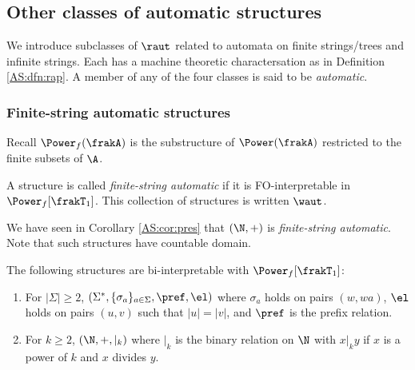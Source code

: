 
\subsection{Other classes of automatic structures}

We introduce subclasses of $\raut$ related to automata on finite strings/trees and infinite strings. 
Each has a machine theoretic charactersation as in Definition \ref{AS:dfn:rap}.
A member of any of the four classes is said to be {\em automatic}. %

\subsubsection*{Finite-string automatic structures}

Recall  $\Power_f(\frakA)$ is the substructure of $\Power(\frakA)$ restricted to the finite subsets of $\A$.

\begin{definition} 
A structure is called {\em finite-string automatic} if it is FO-interpretable in $\Power_f[\frakT_1]$. This collection of structures is written $\waut$.
\end{definition}

We have seen in Corollary \ref{AS:cor:pres} that $(\N,+)$ is {\em finite-string automatic}. 
Note that such structures have countable domain. 

\begin{example}
The following structures are bi-interpretable with $\Power_f[\frakT_1]$:
\begin{enumerate} 
\item For $|\Sigma| \geq 2$, $(\Sigma^\ast,\{\sigma_a\}_{a \in \Sigma},\pref,\el)$ 
where $\sigma_a$ holds on pairs $(w,wa)$, $\el$ holds on pairs $(u,v)$ such that $|u|=|v|$, and $\pref$ is the prefix relation.
\item For $k \geq 2$, $(\N,+,|_k)$
where $|_k$ is the binary relation on $\N$ with $x |_k y$ if $x$ is a power of $k$ and $x$ divides $y$.
\end{enumerate}
\end{example}

